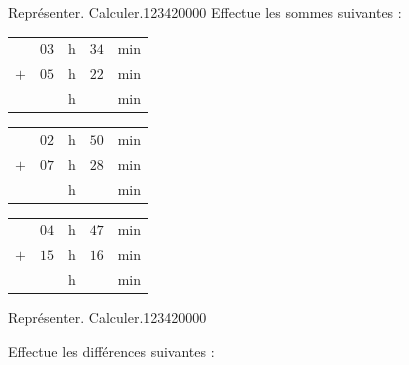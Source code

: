 \begin{pageAD}




\begin{ExoCad}{Représenter. Calculer.}{1234}{2}{0}{0}{0}{0}
 Effectue les sommes suivantes :
 
\begin{minipage}{0.30\linewidth}
\begin{tabular}{ccccc} 
& $03$ & h &  $34$ & min \\ 
$+$   & $05$ & h & $22$  & min\\ 
\hline 
   &  & h & & min\\
\end{tabular} 
\end{minipage}
\hfill 
\begin{minipage}{0.30\linewidth}
 \begin{tabular}{ccccc} 
& $02$ & h &  $50$ & min \\ 
$+$   & $07$ & h &  $28$ & min\\ 
\hline 
   &  & h & & min\\
\end{tabular} 
\end{minipage}
\hfill 
\begin{minipage}{0.30\linewidth}
 \begin{tabular}{ccccc} 
& $04$ & h & $47$  & min \\ 
$+$   & $15$ & h & $16$ & min\\ 
\hline 
   &  & h & & min\\
\end{tabular} 
\end{minipage}
 
\end{ExoCad}



\begin{ExoCad}{Représenter. Calculer.}{1234}{2}{0}{0}{0}{0}

 Effectue les différences suivantes :
 

\end{ExoCad}
\end{pageAD}
